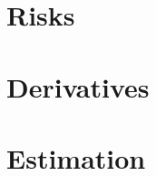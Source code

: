 \documentclass[c, dvipsnames]{beamer}  %
\begin{document}
%
%
%
%
%
%
%
%

%
%
%
%
%
%
%





















\section{Risks}


\section{Derivatives}


\section{Estimation}



%
%
%
%
%
%
%
%
%

%
%
%
%
%
%
%
%
\end{document}
